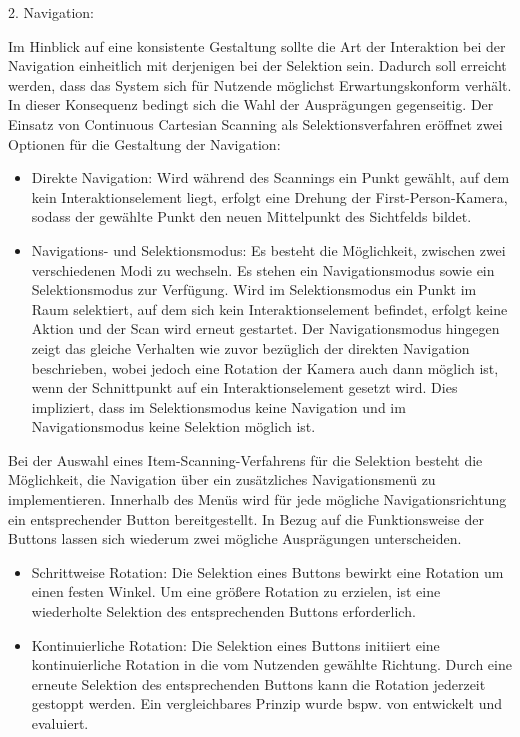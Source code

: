 2. Navigation:

Im Hinblick auf eine konsistente Gestaltung sollte die Art der Interaktion bei der Navigation einheitlich mit derjenigen bei der Selektion sein. Dadurch soll erreicht werden, dass das System sich für Nutzende möglichst Erwartungskonform verhält. In dieser Konsequenz bedingt sich die Wahl der Ausprägungen gegenseitig. Der Einsatz von Continuous Cartesian Scanning als Selektionsverfahren eröffnet zwei Optionen für die Gestaltung der Navigation: 

\begin{itemize}
    \item Direkte Navigation: Wird während des Scannings ein Punkt gewählt, auf dem kein Interaktionselement liegt, erfolgt eine Drehung der First-Person-Kamera, sodass der gewählte Punkt den neuen Mittelpunkt des Sichtfelds bildet.
    \item Navigations- und Selektionsmodus: Es besteht die Möglichkeit, zwischen zwei verschiedenen Modi zu wechseln. Es stehen ein Navigationsmodus sowie ein Selektionsmodus zur Verfügung. Wird im Selektionsmodus ein Punkt im Raum selektiert, auf dem sich kein Interaktionselement befindet, erfolgt keine Aktion und der Scan wird erneut gestartet. Der Navigationsmodus hingegen zeigt das gleiche Verhalten wie zuvor bezüglich der direkten Navigation beschrieben, wobei jedoch eine Rotation der Kamera auch dann möglich ist, wenn der Schnittpunkt auf ein Interaktionselement gesetzt wird. Dies impliziert, dass im Selektionsmodus keine Navigation und im Navigationsmodus keine Selektion möglich ist. 
\end{itemize}

Bei der Auswahl eines Item-Scanning-Verfahrens für die Selektion besteht die Möglichkeit, die Navigation über ein zusätzliches Navigationsmenü zu implementieren. Innerhalb des Menüs wird für jede mögliche Navigationsrichtung ein entsprechender Button bereitgestellt. In Bezug auf die Funktionsweise der Buttons lassen sich wiederum zwei mögliche Ausprägungen unterscheiden. 

\begin{itemize}
    \item Schrittweise Rotation: Die Selektion eines Buttons bewirkt eine Rotation um einen festen Winkel. Um eine größere Rotation zu erzielen, ist eine wiederholte Selektion des entsprechenden Buttons erforderlich.
    \item Kontinuierliche Rotation: Die Selektion eines Buttons initiiert eine kontinuierliche Rotation in die vom Nutzenden gewählte Richtung. Durch eine erneute Selektion des entsprechenden Buttons kann die Rotation jederzeit gestoppt werden. Ein vergleichbares Prinzip wurde bspw. von \citet{10.1145/2159365.2159386} entwickelt und evaluiert. 
\end{itemize}

